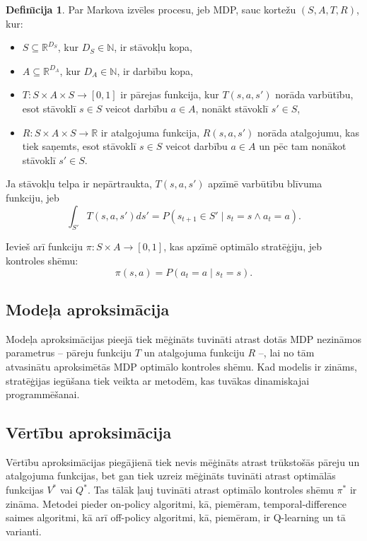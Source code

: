 \documentclass[a0,landscape]{a0poster}
\numberwithin{equation}{section}
\theoremstyle{definition}
\newtheorem{definicija}{Defin\={\i}cija}%
\theoremstyle{plain}
\begin{document}
\begin{multicols}{5}
\begin{definicija}
Par Markova izvēles procesu, jeb MDP, sauc kortežu $(S, A, T, R)$, kur:
\begin{itemize}
	\item $S \subseteq \mathbb{R}^{D_S}$, kur $D_S \in \mathbb{N}$, ir stāvokļu kopa, %
	\item $A \subseteq \mathbb{R}^{D_A}$, kur $D_A \in \mathbb{N}$, ir darbību kopa, %
	\item $T:S \times A \times S \rightarrow [0,1]$ ir pārejas funkcija, kur $T(s, a, s')$ norāda varbūtību, esot stāvoklī $s \in S$ veicot darbību $a \in A$, nonākt stāvoklī $s' \in S$,
	\item $R:S \times A \times S \rightarrow \mathbb{R}$ ir atalgojuma funkcija, $R(s, a, s')$ norāda atalgojumu, kas tiek saņemts, esot stāvoklī $s \in S$ veicot darbību $a \in A$ un pēc tam nonākot stāvoklī $s' \in S$.
\end{itemize}
Ja stāvokļu telpa ir nepārtraukta, $T(s, a, s')$ apzīmē varbūtību blīvuma funkciju, jeb
\[
	\int_{S'} T(s, a, s')ds' = P(s_{t+1} \in S' \mid s_t = s \land a_t = a).
\]
\end{definicija}

Ievieš arī funkciju $\pi: S \times A \rightarrow [0, 1]$, kas apzīmē optimālo stratēģiju, jeb kontroles shēmu:
\[
	\pi(s, a) = P(a_t = a \mid s_t = s).
\]

\subsection*{Modeļa aproksimācija}
Modeļa aproksimācijas pieejā tiek mēģināts tuvināti atrast dotās MDP nezināmos parametrus -- pāreju funkciju $T$ un atalgojuma funkciju $R$ --, lai no tām atvasinātu aproksimētās MDP optimālo kontroles shēmu.
Kad modelis ir zināms, stratēģijas iegūšana tiek veikta ar metodēm, kas tuvākas dinamiskajai programmēšanai.

\subsection*{Vērtību aproksimācija}
Vērtību aproksimācijas piegājienā tiek nevis mēģināts atrast trūkstošās pāreju un atalgojuma funkcijas, bet gan tiek uzreiz mēģināts tuvināti atrast optimālās funkcijas $V^*$ vai $Q^*$.
Tas tālāk ļauj tuvināti atrast optimālo kontroles shēmu $\pi^*$ ir zināma.
Metodei pieder on-policy algoritmi, kā, piemēram, temporal-difference saimes algoritmi, kā arī off-policy algoritmi, kā, piemēram, ir Q-learning un tā varianti.


\end{multicols}
\end{document}
